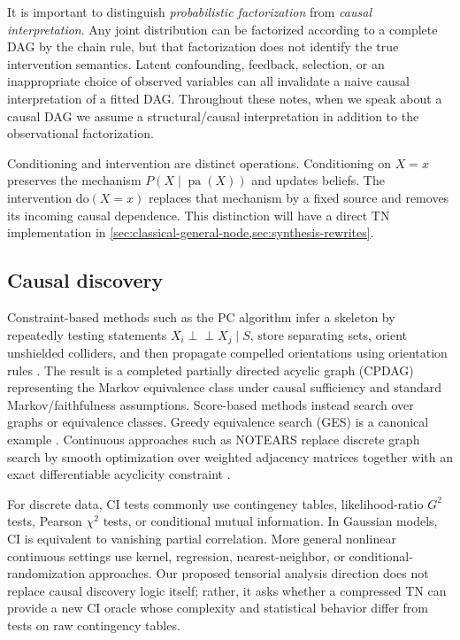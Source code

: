 \documentclass[11pt]{article}
\theoremstyle{remark}
\newcommand{\indep}{\perp\!\!\!\perp}
\newcommand{\pa}{\operatorname{pa}}
\begin{document}
It is important to distinguish \emph{probabilistic factorization} from \emph{causal interpretation}. Any joint distribution can be factorized according to a complete DAG by the chain rule, but that factorization does not identify the true intervention semantics. Latent confounding, feedback, selection, or an inappropriate choice of observed variables can all invalidate a naive causal interpretation of a fitted DAG. Throughout these notes, when we speak about a causal DAG we assume a structural/causal interpretation in addition to the observational factorization.

Conditioning and intervention are distinct operations. Conditioning on $X=x$ preserves the mechanism $P(X\mid \pa(X))$ and updates beliefs. The intervention $\mathrm{do}(X=x)$ replaces that mechanism by a fixed source and removes its incoming causal dependence. This distinction will have a direct TN implementation in \cref{sec:classical-general-node,sec:synthesis-rewrites}.

\subsection{Causal discovery}

Constraint-based methods such as the PC algorithm infer a skeleton by repeatedly testing statements $X_i\indep X_j\mid S$, store separating sets, orient unshielded colliders, and then propagate compelled orientations using orientation rules \cite{spirtes2000causation}. The result is a completed partially directed acyclic graph (CPDAG) representing the Markov equivalence class under causal sufficiency and standard Markov/faithfulness assumptions. Score-based methods instead search over graphs or equivalence classes. Greedy equivalence search (GES) is a canonical example \cite{chickering2002optimal}. Continuous approaches such as NOTEARS replace discrete graph search by smooth optimization over weighted adjacency matrices together with an exact differentiable acyclicity constraint \cite{zheng2018notears}.

For discrete data, CI tests commonly use contingency tables, likelihood-ratio $G^2$ tests, Pearson $\chi^2$ tests, or conditional mutual information. In Gaussian models, CI is equivalent to vanishing partial correlation. More general nonlinear continuous settings use kernel, regression, nearest-neighbor, or conditional-randomization approaches. Our proposed tensorial analysis direction does not replace causal discovery logic itself; rather, it asks whether a compressed TN can provide a new CI oracle whose complexity and statistical behavior differ from tests on raw contingency tables.
\end{document}
